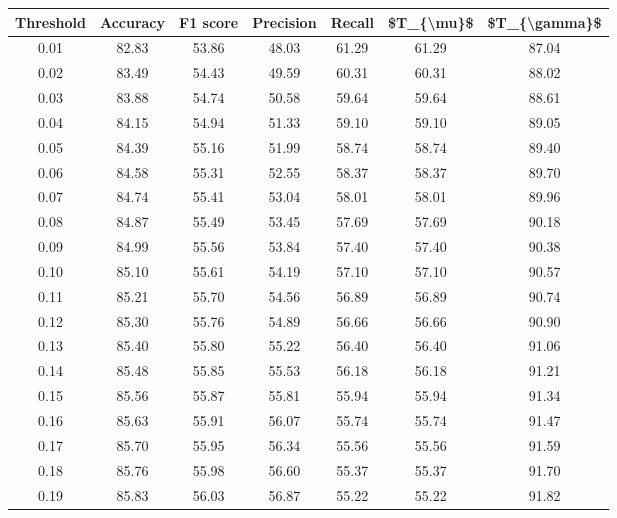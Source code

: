 \begin{tabular}{|c|c|c|c|c|c|c|}
\hline
 Threshold &  Accuracy &  F1 score &  Precision &  Recall &  \$T\_\{\textbackslash mu\}\$ &  \$T\_\{\textbackslash gamma\}\$ \\
\hline
      0.01 &     82.83 &     53.86 &      48.03 &   61.29 &      61.29 &         87.04 \\
      0.02 &     83.49 &     54.43 &      49.59 &   60.31 &      60.31 &         88.02 \\
      0.03 &     83.88 &     54.74 &      50.58 &   59.64 &      59.64 &         88.61 \\
      0.04 &     84.15 &     54.94 &      51.33 &   59.10 &      59.10 &         89.05 \\
      0.05 &     84.39 &     55.16 &      51.99 &   58.74 &      58.74 &         89.40 \\
      0.06 &     84.58 &     55.31 &      52.55 &   58.37 &      58.37 &         89.70 \\
      0.07 &     84.74 &     55.41 &      53.04 &   58.01 &      58.01 &         89.96 \\
      0.08 &     84.87 &     55.49 &      53.45 &   57.69 &      57.69 &         90.18 \\
      0.09 &     84.99 &     55.56 &      53.84 &   57.40 &      57.40 &         90.38 \\
      0.10 &     85.10 &     55.61 &      54.19 &   57.10 &      57.10 &         90.57 \\
      0.11 &     85.21 &     55.70 &      54.56 &   56.89 &      56.89 &         90.74 \\
      0.12 &     85.30 &     55.76 &      54.89 &   56.66 &      56.66 &         90.90 \\
      0.13 &     85.40 &     55.80 &      55.22 &   56.40 &      56.40 &         91.06 \\
      0.14 &     85.48 &     55.85 &      55.53 &   56.18 &      56.18 &         91.21 \\
      0.15 &     85.56 &     55.87 &      55.81 &   55.94 &      55.94 &         91.34 \\
      0.16 &     85.63 &     55.91 &      56.07 &   55.74 &      55.74 &         91.47 \\
      0.17 &     85.70 &     55.95 &      56.34 &   55.56 &      55.56 &         91.59 \\
      0.18 &     85.76 &     55.98 &      56.60 &   55.37 &      55.37 &         91.70 \\
      0.19 &     85.83 &     56.03 &      56.87 &   55.22 &      55.22 &         91.82 \\

\end{tabular}

